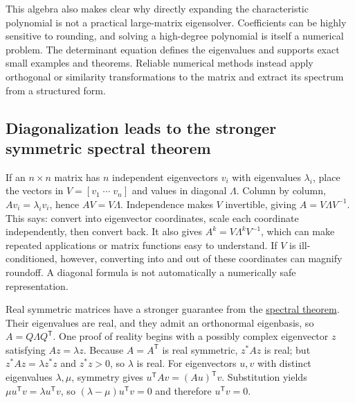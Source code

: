 This algebra also makes clear why directly expanding the characteristic polynomial is not a practical large-matrix eigensolver. Coefficients can be highly sensitive to rounding, and solving a high-degree polynomial is itself a numerical problem. The determinant equation defines the eigenvalues and supports exact small examples and theorems. Reliable numerical methods instead apply orthogonal or similarity transformations to the matrix and extract its spectrum from a structured form.

\subsection{Diagonalization leads to the stronger symmetric spectral theorem}\label{01-foundations-i-ch020-diagonalization-leads-to-the-stronger-symmetric-spectral-theorem}

\hypertarget{01-foundations-i-ch020-diagonalization-leads-to-the-stronger-symmetric-spectral-theorem}{}

If an \(n\times n\) matrix has \(n\) independent eigenvectors \(v_i\) with eigenvalues \(\lambda_i\), place the vectors in \(V=[v_1\;\cdots\;v_n]\) and values in diagonal \(\Lambda\). Column by column, \(Av_i=\lambda_i v_i\), hence \(AV=V\Lambda\). Independence makes \(V\) invertible, giving \(A=V\Lambda V^{-1}\). This says: convert into eigenvector coordinates, scale each coordinate independently, then convert back. It also gives \(A^k=V\Lambda^kV^{-1}\), which can make repeated applications or matrix functions easy to understand. If \(V\) is ill-conditioned, however, converting into and out of these coordinates can magnify roundoff. A diagonal formula is not automatically a numerically safe representation.

Real symmetric matrices have a stronger guarantee from the \hyperref[01-foundations-i-ch020-eigenvalues-eigenspaces-and-the-two-kinds-of-multiplicity]{spectral theorem}. Their eigenvalues are real, and they admit an orthonormal eigenbasis, so \(A=Q\Lambda Q^\mathsf T\). One proof of reality begins with a possibly complex eigenvector \(z\) satisfying \(Az=\lambda z\). Because \(A=A^\mathsf T\) is real symmetric, \(z^*Az\) is real; but \(z^*Az=\lambda z^*z\) and \(z^*z>0\), so \(\lambda\) is real. For eigenvectors \(u,v\) with distinct eigenvalues \(\lambda,\mu\), symmetry gives \(u^\mathsf TAv=(Au)^\mathsf Tv\). Substitution yields \(\mu u^\mathsf Tv=\lambda u^\mathsf Tv\), so \((\lambda-\mu)u^\mathsf Tv=0\) and therefore \(u^\mathsf Tv=0\).

